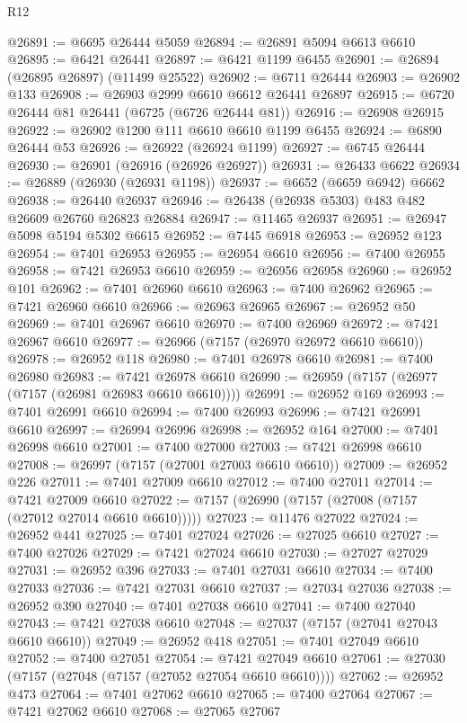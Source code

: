 \begin{lexlean}{R12}
\begin{coremodule}
@26891 := @6695 @26444 @5059
@26894 := @26891 @5094 @6613 @6610
@26895 := @6421 @26441
@26897 := @6421 @1199 @6455
@26901 := @26894 (@26895 @26897) (@11499 @25522)
@26902 := @6711 @26444
@26903 := @26902 @133
@26908 := @26903 @2999 @6610 @6612 @26441 @26897
@26915 := @6720 @26444 @81 @26441 (@6725 (@6726 @26444 @81))
@26916 := @26908 @26915
@26922 := @26902 @1200 @111 @6610 @6610 @1199 @6455
@26924 := @6890 @26444 @53
@26926 := @26922 (@26924 @1199)
@26927 := @6745 @26444
@26930 := @26901 (@26916 (@26926 @26927))
@26931 := @26433 @6622
@26934 := @26889 (@26930 (@26931 @1198))
@26937 := @6652 (@6659 @6942) @6662
@26938 := @26440 @26937
@26946 := @26438 (@26938 @5303) @483 @482 @26609 @26760 @26823 @26884
@26947 := @11465 @26937
@26951 := @26947 @5098 @5194 @5302 @6615
@26952 := @7445 @6918
@26953 := @26952 @123
@26954 := @7401 @26953
@26955 := @26954 @6610
@26956 := @7400 @26955
@26958 := @7421 @26953 @6610
@26959 := @26956 @26958
@26960 := @26952 @101
@26962 := @7401 @26960 @6610
@26963 := @7400 @26962
@26965 := @7421 @26960 @6610
@26966 := @26963 @26965
@26967 := @26952 @50
@26969 := @7401 @26967 @6610
@26970 := @7400 @26969
@26972 := @7421 @26967 @6610
@26977 := @26966 (@7157 (@26970 @26972 @6610 @6610))
@26978 := @26952 @118
@26980 := @7401 @26978 @6610
@26981 := @7400 @26980
@26983 := @7421 @26978 @6610
@26990 := @26959 (@7157 (@26977 (@7157 (@26981 @26983 @6610 @6610))))
@26991 := @26952 @169
@26993 := @7401 @26991 @6610
@26994 := @7400 @26993
@26996 := @7421 @26991 @6610
@26997 := @26994 @26996
@26998 := @26952 @164
@27000 := @7401 @26998 @6610
@27001 := @7400 @27000
@27003 := @7421 @26998 @6610
@27008 := @26997 (@7157 (@27001 @27003 @6610 @6610))
@27009 := @26952 @226
@27011 := @7401 @27009 @6610
@27012 := @7400 @27011
@27014 := @7421 @27009 @6610
@27022 := @7157 (@26990 (@7157 (@27008 (@7157 (@27012 @27014 @6610 @6610)))))
@27023 := @11476 @27022
@27024 := @26952 @441
@27025 := @7401 @27024
@27026 := @27025 @6610
@27027 := @7400 @27026
@27029 := @7421 @27024 @6610
@27030 := @27027 @27029
@27031 := @26952 @396
@27033 := @7401 @27031 @6610
@27034 := @7400 @27033
@27036 := @7421 @27031 @6610
@27037 := @27034 @27036
@27038 := @26952 @390
@27040 := @7401 @27038 @6610
@27041 := @7400 @27040
@27043 := @7421 @27038 @6610
@27048 := @27037 (@7157 (@27041 @27043 @6610 @6610))
@27049 := @26952 @418
@27051 := @7401 @27049 @6610
@27052 := @7400 @27051
@27054 := @7421 @27049 @6610
@27061 := @27030 (@7157 (@27048 (@7157 (@27052 @27054 @6610 @6610))))
@27062 := @26952 @473
@27064 := @7401 @27062 @6610
@27065 := @7400 @27064
@27067 := @7421 @27062 @6610
@27068 := @27065 @27067

\end{coremodule}
\end{lexlean}
